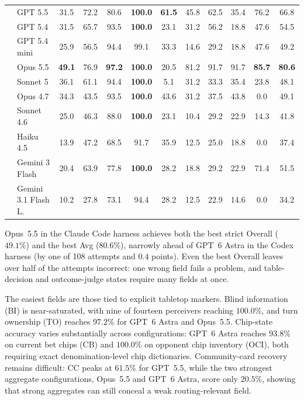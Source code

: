\begin{table}[t]
\begin{tabular*}{\linewidth}{@{\extracolsep{\fill}}llc:ccccccccc@{}}
        & GPT 5.5 & 31.5 & 72.2 & 80.6 & \textbf{100.0} & \textbf{61.5} & 45.8 & 62.5 & 35.4 & 76.2 & 66.8 \\
        & GPT 5.4 & 31.5 & 65.7 & 93.5 & \textbf{100.0} & 23.1 & 31.2 & 56.2 & 18.8 & 47.6 & 54.5 \\
        & GPT 5.4 mini & 25.9 & 56.5 & 94.4 & 99.1 & 33.3 & 14.6 & 29.2 & 18.8 & 47.6 & 49.2 \\
        \midrule{}
         & Opus 5.5 & \textbf{49.1} & 76.9 & \textbf{97.2} & \textbf{100.0} & 20.5 & 81.2 & 91.7 & 91.7 & \textbf{85.7} & \textbf{80.6} \\
        & Sonnet 5 & 36.1 & 61.1 & 94.4 & \textbf{100.0} & 5.1 & 31.2 & 33.3 & 35.4 & 23.8 & 48.1 \\
        & Opus 4.7 & 34.3 & 43.5 & 93.5 & \textbf{100.0} & 43.6 & 31.2 & 37.5 & 43.8 & 0.0 & 49.1 \\
        & Sonnet 4.6 & 25.0 & 46.3 & 88.0 & \textbf{100.0} & 23.1 & 10.4 & 29.2 & 22.9 & 14.3 & 41.8 \\
        & Haiku 4.5 & 13.9 & 47.2 & 68.5 & 91.7 & 35.9 & 12.5 & 25.0 & 18.8 & 0.0 & 37.4 \\
        \midrule{}
         & Gemini 3 Flash & 20.4 & 63.9 & 77.8 & \textbf{100.0} & 28.2 & 18.8 & 29.2 & 22.9 & 71.4 & 51.5 \\
        & Gemini 3.1 Flash L. & 10.2 & 27.8 & 73.1 & 94.4 & 28.2 & 12.5 & 22.9 & 14.6 & 0.0 & 34.2 \\
        \bottomrule
    \end{tabular*}
    \vspace{-1.0em}
\end{table}

Opus~5.5 in the Claude Code harness achieves both the best strict Overall ($49.1\%$) and the best Avg ($80.6\%$), narrowly ahead of GPT~6 Astra in the Codex harness (by one of 108 attempts and $0.4$ points). Even the best Overall leaves over half of the attempts incorrect: one wrong field fails a problem, and table-decision and outcome-judge states require many fields at once.

The easiest fields are those tied to explicit tabletop markers. Blind information (BI) is near-saturated, with nine of fourteen perceivers reaching $100.0\%$, and turn ownership (TO) reaches $97.2\%$ for GPT~6 Astra and Opus~5.5. Chip-state accuracy varies substantially across configurations: GPT~6 Astra reaches $93.8\%$ on current bet chips (CB) and $100.0\%$ on opponent chip inventory (OCI), both requiring exact denomination-level chip dictionaries. Community-card recovery remains difficult: CC peaks at $61.5\%$ for GPT~5.5, while the two strongest aggregate configurations, Opus~5.5 and GPT~6 Astra, score only $20.5\%$, showing that strong aggregates can still conceal a weak routing-relevant field.

